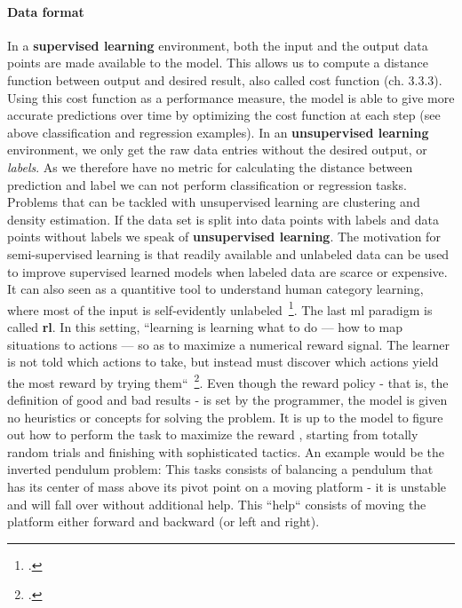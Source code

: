 \paragraph*{Data format}
In a \textbf{supervised learning} environment, both the input and the output data points are made available to the model. This allows us to compute a distance function between output and desired result, also called cost function (ch. 3.3.3). Using this cost function as a performance measure, the model is able to give more accurate predictions over time by optimizing the cost function at each step (see above classification and regression examples). In an \textbf{unsupervised learning} environment, we only get the raw data entries without the desired output, or \textit{labels}. As we therefore have no metric for calculating the distance between prediction and label we can not perform classification or regression tasks. Problems that can be tackled with unsupervised learning are clustering and density estimation. If the data set is split into data points with labels and data points without labels we speak of \textbf{unsupervised learning}. The motivation for semi-supervised learning is that readily available and unlabeled data can be used to improve supervised learned models when labeled data are scarce or expensive. It can also seen as a quantitive tool to understand human category learning, where most of the input is self-evidently unlabeled~\footcite{6813505}. The last \gls{ml} paradigm is called \textbf{\gls{rl}}. In this setting, “learning is learning what to do — how to map situations to actions — so as to maximize a numerical reward signal. The learner is not told which actions to take, but instead must discover which actions yield the most reward by trying them“~\footcite{10.5555/551283}. Even though the reward policy - that is, the definition of good and bad results - is set by the programmer, the model is given no heuristics or concepts for solving the problem. It is up to the model to figure out how to perform the task to maximize the reward , starting from totally random trials and finishing with sophisticated tactics. An example would be the inverted pendulum problem: This tasks consists of balancing a pendulum that has its center of mass above its pivot point on a moving platform - it is unstable and will fall over without additional help. This “help“ consists of moving the platform either forward and backward (or left and right).

